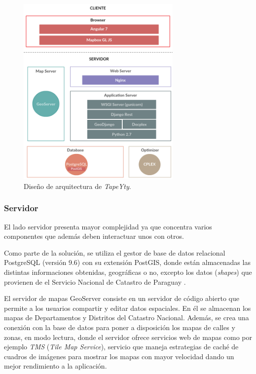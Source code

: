 \documentclass[conference,compsoc]{IEEEtran}
\begin{document}
\begin{figure}[tbp]
\centerline{\includegraphics[width=8cm]{imagenes/20190424_WebAppArchitectureDesign.png}}
\caption{Diseño de arquitectura de \textit{TapeYty}.}
\label{fig:disenhoArquitectura}
\end{figure}

\subsubsection{Servidor}

El lado servidor presenta mayor complejidad ya que concentra varios componentes que además deben interactuar unos con otros.

Como parte de la solución, se utiliza el gestor de base de datos relacional PostgreSQL (versión 9.6) con su extensión PostGIS, donde están almacenadas las distintas informaciones obtenidas, geográficas o no, excepto los datos (\textit{shapes}) que provienen de el Servicio Nacional de Catastro de Paraguay \cite{SNC}.

El servidor de mapas GeoServer \cite{GeoServer} consiste en un servidor de código abierto que permite a los usuarios compartir y editar datos espaciales. En él se almacenan los mapas de Departamentos y Distritos del Catastro Nacional. Además, se crea una conexión con la base de datos para poner a disposición los mapas de calles y zonas, en modo lectura, donde el servidor ofrece servicios web de mapas como por ejemplo \textit{TMS} (\textit{Tile Map Service}), servicio que maneja estrategias de caché de cuadros de imágenes para mostrar los mapas con mayor velocidad dando un mejor rendimiento a la aplicación.
\end{document}

